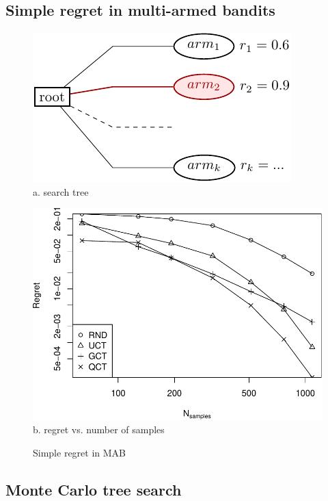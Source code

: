 \documentclass{article}
\begin{document}
\subsection{Simple regret in multi-armed bandits}


\begin{figure}[t]
  \begin{minipage}[c]{0.5\linewidth}
    \centering
    \includegraphics[scale=1.0]{onelevel-tree.pdf}\\
    \vspace{4em}
    a. search tree
  \end{minipage}
  \begin{minipage}[c]{0.5\linewidth}
    \centering
    \includegraphics[scale=0.5]{flat-trilevel-k=64-uqb=8.pdf}\\
    b. regret vs. number of samples
  \end{minipage}
  \label{fig:mab-simple-regret}
  \caption{Simple regret in MAB}
\end{figure}

\subsection{Monte Carlo tree search}
\end{document}
